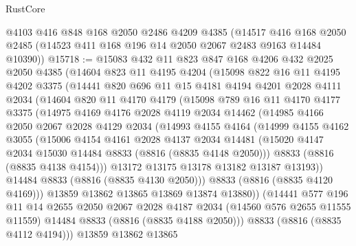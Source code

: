 \begin{lexlean}{RustCore}
\begin{coremodule}
    @4103
    @416
    @848
    @168
    @2050
    @2486
    @4209
    @4385
    (@14517 @416 @168 @2050 @2485 (@14523 @411 @168 @196 @14 @2050 @2067 @2483 @9163 @14484 @10390))
@15718 := @15083
    @432
    @11
    @823
    @847
    @168
    @4206
    @432
    @2025
    @2050
    @4385
    (@14604
      @823
      @11
      @4195
      @4204
      (@15098
        @822
        @16
        @11
        @4195
        @4202
        @3375
        (@14441
          @820
          @696
          @11
          @15
          @4181
          @4194
          @4201
          @2028
          @4111
          @2034
          (@14604
            @820
            @11
            @4170
            @4179
            (@15098
              @789
              @16
              @11
              @4170
              @4177
              @3375
              (@14975
                @4169
                @4176
                @2028
                @4119
                @2034
                @14462
                (@14985
                  @4166
                  @2050
                  @2067
                  @2028
                  @4129
                  @2034
                  (@14993
                    @4155
                    @4164
                    (@14999
                      @4155
                      @4162
                      @3055
                      (@15006
                        @4154
                        @4161
                        @2028
                        @4137
                        @2034
                        @14481
                        (@15020 @4147 @2034 @15030 @14484 @8833 (@8816 (@8835 @4148 @2050)))
                        @8833
                        (@8816 (@8835 @4138 @4154)))
                      @13172
                      @13175
                      @13178
                      @13182
                      @13187
                      @13193))
                  @14484
                  @8833
                  (@8816 (@8835 @4130 @2050)))
                @8833
                (@8816 (@8835 @4120 @4169)))
              @13859
              @13862
              @13865
              @13869
              @13874
              @13880))
          (@14441
            @577
            @196
            @11
            @14
            @2655
            @2050
            @2067
            @2028
            @4187
            @2034
            (@14560 @576 @2655 @11555 @11559)
            @14484
            @8833
            (@8816 (@8835 @4188 @2050)))
          @8833
          (@8816 (@8835 @4112 @4194)))
        @13859
        @13862
        @13865

\end{coremodule}
\end{lexlean}
